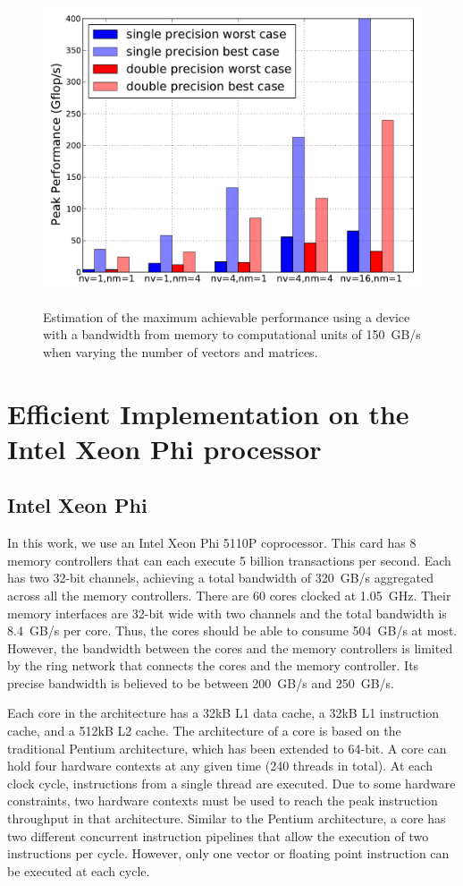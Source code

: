 \documentclass[10pt,conference,compsocconf]{IEEEtran}
\begin{document}
\begin{figure}
  \centering 
  \includegraphics[width=.9\linewidth]{figures/gflops_peak.pdf}\label{fig:gflops-peak-perf}
  \caption{Estimation of the maximum achievable performance using a
    device with a bandwidth from memory to computational units of 150~GB/s when
    varying the number of vectors and matrices.}
  \label{fig:perf_predict}
\end{figure}

\section{Efficient Implementation on the Intel Xeon Phi processor}
\label{sec:impl}

\subsection{Intel Xeon Phi}

In this work, we use an Intel Xeon Phi 5110P coprocessor. This card
has 8 memory controllers that can each execute 5 billion
transactions per second. Each has two 32-bit channels, achieving a total
bandwidth of 320~GB/s aggregated across all the memory
controllers. There are 60 cores clocked at 1.05~GHz. Their memory
interfaces are 32-bit wide with two channels and the total bandwidth
is 8.4~GB/s per core. Thus, the cores should be able to consume 504~GB/s
at most. However, the bandwidth between the cores and the memory
controllers is limited by the ring network that connects the cores and
the memory controller. Its precise bandwidth is
believed to be between 200~GB/s and 250~GB/s.

Each core in the architecture has a 32kB L1 data cache, a 32kB L1
instruction cache, and a 512kB L2 cache. The architecture of a core is
based on the traditional Pentium architecture, which has been extended to
64-bit. A core can hold four hardware contexts at any given time (240 threads in total). At each
clock cycle, instructions from a single thread are executed. Due to
some hardware constraints, two hardware contexts must be used to reach
the peak instruction throughput in that architecture. Similar to the
Pentium architecture, a core has two different concurrent instruction
pipelines that allow the execution of two instructions per
cycle. However, only one vector or floating point instruction can be
executed at each cycle.
\end{document}
